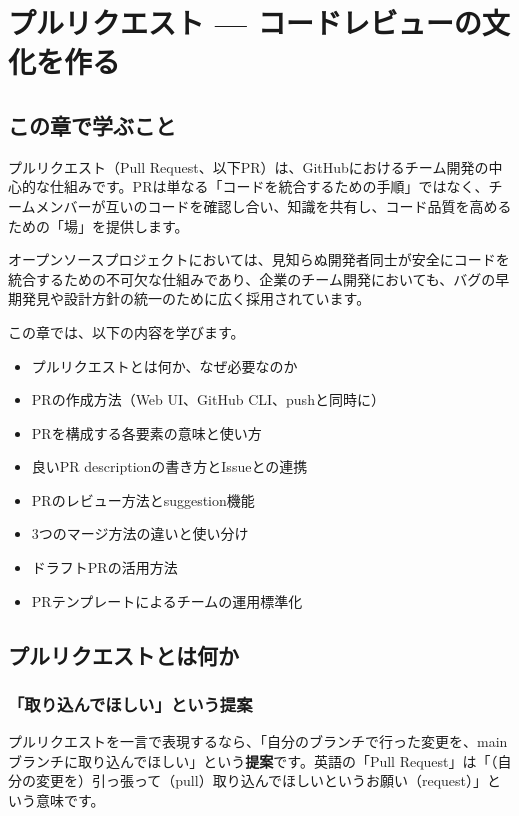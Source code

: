 \chapter{プルリクエスト --- コードレビューの文化を作る}

\section{この章で学ぶこと}

プルリクエスト（Pull Request、以下PR）は、GitHubにおけるチーム開発の中心的な仕組みです。PRは単なる「コードを統合するための手順」ではなく、チームメンバーが互いのコードを確認し合い、知識を共有し、コード品質を高めるための「場」を提供します。

オープンソースプロジェクトにおいては、見知らぬ開発者同士が安全にコードを統合するための不可欠な仕組みであり、企業のチーム開発においても、バグの早期発見や設計方針の統一のために広く採用されています。

この章では、以下の内容を学びます。

\begin{itemize}
  \item プルリクエストとは何か、なぜ必要なのか
  \item PRの作成方法（Web UI、GitHub CLI、pushと同時に）
  \item PRを構成する各要素の意味と使い方
  \item 良いPR descriptionの書き方とIssueとの連携
  \item PRのレビュー方法とsuggestion機能
  \item 3つのマージ方法の違いと使い分け
  \item ドラフトPRの活用方法
  \item PRテンプレートによるチームの運用標準化
\end{itemize}

\section{プルリクエストとは何か}

\subsection{「取り込んでほしい」という提案}

プルリクエストを一言で表現するなら、「自分のブランチで行った変更を、mainブランチに取り込んでほしい」という\textbf{提案}です。英語の「Pull Request」は「（自分の変更を）引っ張って（pull）取り込んでほしいというお願い（request）」という意味です。

